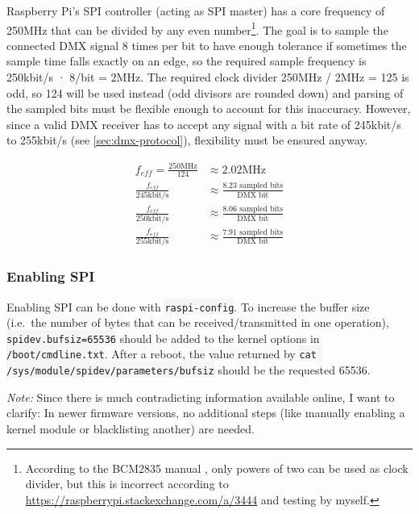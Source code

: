 Raspberry Pi's SPI controller (acting as SPI master) has a core
frequency of 250MHz that can be divided by any even number\footnote{According
  to the BCM2835 manual \citep{broadcom-bcm2835}, only powers of two can
  be used as clock divider, but this is incorrect according to
  \url{https://raspberrypi.stackexchange.com/a/3444} and testing by
  myself.}. The goal is to sample the connected DMX signal 8 times per
bit to have enough tolerance if sometimes the sample time falls exactly
on an edge, so the required sample frequency is 250kbit/s · 8/bit =
2MHz. The required clock divider 250MHz / 2MHz = 125 is odd, so 124 will
be used instead (odd divisors are rounded down) and parsing of the
sampled bits must be flexible enough to account for this inaccuracy.
However, since a valid DMX receiver has to accept any signal with a bit
rate of 245kbit/s to 255kbit/s (see \cref{sec:dmx-protocol}),
flexibility must be ensured anyway.

\begin{align*}
f_{eff} = \frac{250\text{MHz}}{124} &\approx 2.02\text{MHz}\\[3pt]
\frac{f_{eff}}{245\text{kbit/s}} &\approx \frac{8.23\text{ sampled bits}}{\text{DMX bit}}\\[3pt]
\frac{f_{eff}}{250\text{kbit/s}} &\approx \frac{8.06\text{ sampled bits}}{\text{DMX bit}}\\[3pt]
\frac{f_{eff}}{255\text{kbit/s}} &\approx \frac{7.91\text{ sampled bits}}{\text{DMX bit}}
\end{align*}

\subsubsection{Enabling SPI}\label{enabling-spi}

Enabling SPI can be done with \colorbox{WhiteSmoke}{\lstinline!raspi-config!}. To increase the
buffer size (i.e.~the number of bytes that can be received/transmitted
in one operation), \colorbox{WhiteSmoke}{\lstinline!spidev.bufsiz=65536!} should be added to
the kernel options in \colorbox{WhiteSmoke}{\lstinline!/boot/cmdline.txt!}. After a reboot, the
value returned by \colorbox{WhiteSmoke}{\lstinline!cat /sys/module/spidev/parameters/bufsiz!}
should be the requested 65536.

\emph{Note:} Since there is much contradicting information available
online, I want to clarify: In newer firmware versions, no additional
steps (like manually enabling a kernel module or blacklisting another)
are needed.

